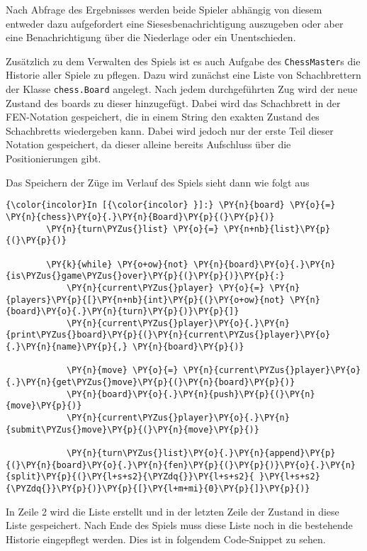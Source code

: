 Nach Abfrage des Ergebnisses werden beide Spieler abhängig von diesem
entweder dazu aufgefordert eine Siesesbenachrichtigung auszugeben oder
aber eine Benachrichtigung über die Niederlage oder ein Unentschieden.

Zusätzlich zu dem Verwalten des Spiels ist es auch Aufgabe des
\texttt{ChessMaster}s die Historie aller Spiele zu pflegen. Dazu wird
zunächst eine Liste von Schachbrettern der Klasse \texttt{chess.Board}
angelegt. Nach jedem durchgeführten Zug wird der neue Zustand des boards
zu dieser hinzugefügt. Dabei wird das Schachbrett in der FEN-Notation
gespeichert, die in einem String den exakten Zustand des Schachbretts
wiedergeben kann. Dabei wird jedoch nur der erste Teil dieser Notation
gespeichert, da dieser alleine bereits Aufschluss über die
Positionierungen gibt.

Das Speichern der Züge im Verlauf des Spiels sieht dann wie folgt aus

    \begin{Verbatim}[commandchars=\\\{\}]
{\color{incolor}In [{\color{incolor} }]:} \PY{n}{board} \PY{o}{=} \PY{n}{chess}\PY{o}{.}\PY{n}{Board}\PY{p}{(}\PY{p}{)}
        \PY{n}{turn\PYZus{}list} \PY{o}{=} \PY{n+nb}{list}\PY{p}{(}\PY{p}{)}
        
        \PY{k}{while} \PY{o+ow}{not} \PY{n}{board}\PY{o}{.}\PY{n}{is\PYZus{}game\PYZus{}over}\PY{p}{(}\PY{p}{)}\PY{p}{:}
            \PY{n}{current\PYZus{}player} \PY{o}{=} \PY{n}{players}\PY{p}{[}\PY{n+nb}{int}\PY{p}{(}\PY{o+ow}{not} \PY{n}{board}\PY{o}{.}\PY{n}{turn}\PY{p}{)}\PY{p}{]}
            \PY{n}{current\PYZus{}player}\PY{o}{.}\PY{n}{print\PYZus{}board}\PY{p}{(}\PY{n}{current\PYZus{}player}\PY{o}{.}\PY{n}{name}\PY{p}{,} \PY{n}{board}\PY{p}{)}
        
            \PY{n}{move} \PY{o}{=} \PY{n}{current\PYZus{}player}\PY{o}{.}\PY{n}{get\PYZus{}move}\PY{p}{(}\PY{n}{board}\PY{p}{)}
            \PY{n}{board}\PY{o}{.}\PY{n}{push}\PY{p}{(}\PY{n}{move}\PY{p}{)}
            \PY{n}{current\PYZus{}player}\PY{o}{.}\PY{n}{submit\PYZus{}move}\PY{p}{(}\PY{n}{move}\PY{p}{)}
            
            \PY{n}{turn\PYZus{}list}\PY{o}{.}\PY{n}{append}\PY{p}{(}\PY{n}{board}\PY{o}{.}\PY{n}{fen}\PY{p}{(}\PY{p}{)}\PY{o}{.}\PY{n}{split}\PY{p}{(}\PY{l+s+s2}{\PYZdq{}}\PY{l+s+s2}{ }\PY{l+s+s2}{\PYZdq{}}\PY{p}{)}\PY{p}{[}\PY{l+m+mi}{0}\PY{p}{]}\PY{p}{)}
\end{Verbatim}

    In Zeile 2 wird die Liste erstellt und in der letzten Zeile der Zustand
in diese Liste gespeichert. Nach Ende des Spiels muss diese Liste noch
in die bestehende Historie eingepflegt werden. Dies ist in folgendem
Code-Snippet zu sehen.

